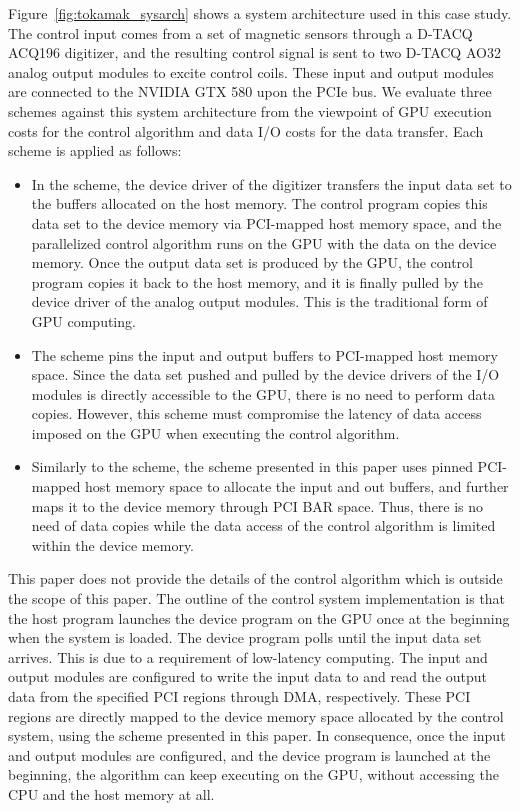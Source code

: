 Figure~\ref{fig:tokamak_sysarch} shows a system architecture used in
this case study.
The control input comes from a set of magnetic sensors through a D-TACQ
ACQ196 digitizer, and the resulting control signal is sent to two D-TACQ
AO32 analog output modules to excite control coils.
These input and output modules are connected to the NVIDIA GTX 580 upon the PCIe bus.
We evaluate three schemes against this system architecture
from the viewpoint of GPU execution costs for the control algorithm and
data I/O costs for the data transfer.
Each scheme is applied as follows:
\begin{itemize} \itemsep1pt
 \item In the {\hd} scheme, the device driver of the digitizer transfers
       the input data set to the buffers allocated on the host memory.
       The control program copies this data set to the device memory via
       PCI-mapped host memory space, and the parallelized control
       algorithm runs on the GPU with the data on the device memory.
       Once the output data set is produced by the GPU, the control
       program copies it back to the host memory, and it is finally
       pulled by the device driver of the analog output modules.
       This is the traditional form of GPU computing.
 \item The {\hp} scheme pins the input and output buffers to PCI-mapped
       host memory space.
       Since the data set pushed and pulled by the device drivers of
       the I/O modules is directly accessible to the GPU, there is no
       need to perform data copies.
       However, this scheme must compromise the latency of data access
       imposed on the GPU when executing the control algorithm.
 \item Similarly to the {\hp} scheme, the {\dm} scheme presented in this
       paper uses pinned PCI-mapped host memory space to allocate the
       input and out buffers, and further maps it to the device memory
       through PCI BAR space.
       Thus, there is no need of data copies while the data access of
       the control algorithm is limited within the device memory.
\end{itemize}

This paper does not provide the details of the control
algorithm which is outside the scope of this paper.
The outline of the control system implementation is that the host
program launches the device program on the GPU once at the beginning
when the system is loaded.
The device program polls until the input data set arrives.
This is due to a requirement of low-latency computing.
The input and output modules are configured to write the input data to
and read the output data from the specified PCI regions through DMA,
respectively.
These PCI regions are directly mapped to the device memory space
allocated by the control system, using the {\dm} scheme presented in this
paper.
In consequence, once the input and output modules are configured, and
the device program is launched at the beginning, the algorithm can keep
executing on the GPU, without accessing the CPU and the host memory at
all.

